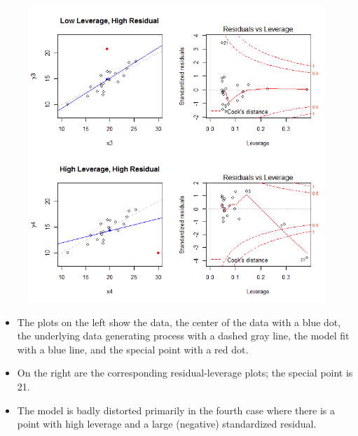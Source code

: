 \documentclass[residuals.tex]{subfiles}
\begin{document}
\begin{figure}[h!]
\centering
\includegraphics[width=1.0\linewidth]{plots3}
\caption{}
\label{fig:plots3}
\end{figure}
\newpage
\begin{itemize}
\item The plots on the left show the data, the center of the data  with a blue dot, the underlying data generating process with a dashed gray line, the model fit with a blue line, and the special point with a red dot. 
\item On the right are the corresponding residual-leverage plots; the special point is 21. 
\item The model is badly distorted primarily in the fourth case where there is a point with high leverage and a large (negative) standardized residual. 

\end{itemize}


\end{document}
